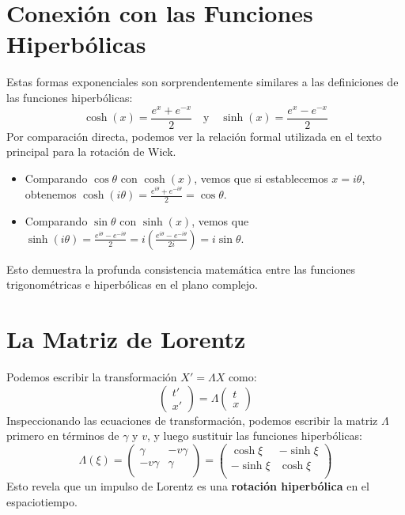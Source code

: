 \documentclass[11pt,a4paper]{book}
\begin{document}
\section{Conexión con las Funciones Hiperbólicas}

Estas formas exponenciales son sorprendentemente similares a las definiciones de las funciones hiperbólicas:
\[ \cosh(x) = \frac{e^x + e^{-x}}{2} \quad \text{y} \quad \sinh(x) = \frac{e^x - e^{-x}}{2} \]
Por comparación directa, podemos ver la relación formal utilizada en el texto principal para la rotación de Wick.
\begin{itemize}
    \item Comparando $\cos\theta$ con $\cosh(x)$, vemos que si establecemos $x=i\theta$, obtenemos $\cosh(i\theta) = \frac{e^{i\theta} + e^{-i\theta}}{2} = \cos\theta$.
    \item Comparando $\sin\theta$ con $\sinh(x)$, vemos que $\sinh(i\theta) = \frac{e^{i\theta} - e^{-i\theta}}{2} = i \left( \frac{e^{i\theta} - e^{-i\theta}}{2i} \right) = i\sin\theta$.
\end{itemize}
Esto demuestra la profunda consistencia matemática entre las funciones trigonométricas e hiperbólicas en el plano complejo.

\section{La Matriz de Lorentz}
Podemos escribir la transformación $X' = \Lambda X$ como:
\[ \begin{pmatrix} t' \\ x'  \end{pmatrix} = \Lambda \begin{pmatrix} t \\ x  \end{pmatrix} \]
Inspeccionando las ecuaciones de transformación, podemos escribir la matriz $\Lambda$ primero en términos de $\gamma$ y $v$, y luego sustituir las funciones hiperbólicas:
\[
\Lambda(\xi) = \begin{pmatrix} \gamma & -v\gamma  \\ -v\gamma & \gamma  \\  \end{pmatrix}
=
\boxed{
\begin{pmatrix} \cosh\xi & -\sinh\xi  \\ -\sinh\xi & \cosh\xi  \\  \end{pmatrix}
}
\]
Esto revela que un impulso de Lorentz es una \textbf{rotación hiperbólica} en el espaciotiempo.
\end{document}
